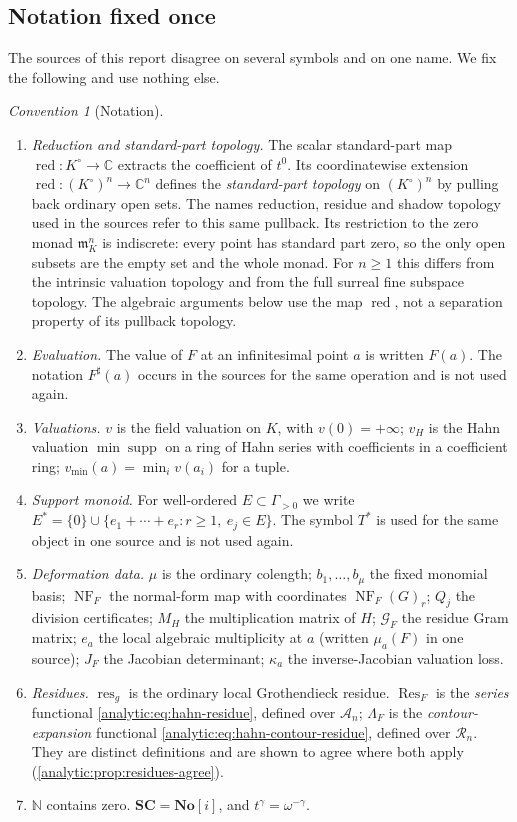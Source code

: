 \documentclass[11pt,letterpaper]{article}
\theoremstyle{definition}
\theoremstyle{remark}
\newtheorem{convention}[theorem]{Convention}
\newcommand{\C}{\mathbb C}
\newcommand{\N}{\mathbb N}
\newcommand{\No}{\mathbf{No}}
\newcommand{\SC}{\mathbf{SC}}
\newcommand{\A}{\mathscr A}
\newcommand{\RR}{\mathscr R}
\newcommand{\m}{\mathfrak m}
\newcommand{\Res}{\operatorname{Res}}
\newcommand{\res}{\operatorname{res}}
\newcommand{\supp}{\operatorname{supp}}
\newcommand{\NF}{\operatorname{NF}}
\newcommand{\red}{\operatorname{red}}
\newcommand{\vH}{v_{\!H}}
\newcommand{\vmin}{v_{\min}}
\numberwithin{equation}{section}
\begin{document}
\subsection{Notation fixed once}\label{analytic:subsec:conventions}
The sources of this report disagree on several symbols and on one name. We
fix the following and use nothing else.

\begin{convention}[Notation]\label{analytic:conv:notation}
\begin{enumerate}
\item \emph{Reduction and standard-part topology.} The scalar standard-part
map $\red:K^\circ\to\C$ extracts the coefficient of $t^0$. Its coordinatewise
extension $\red:(K^\circ)^n\to\C^n$ defines the \emph{standard-part topology}
on $(K^\circ)^n$ by pulling back ordinary open sets. The names reduction,
residue and shadow topology used in the sources refer to this same pullback.
Its restriction to the zero monad $\m_K^n$ is indiscrete: every point has
standard part zero, so the only open subsets are the empty set and the whole
monad. For $n\ge1$ this differs from the intrinsic valuation topology and
from the full surreal fine subspace topology. The algebraic arguments below use the
map $\red$, not a separation property of its pullback topology.
\item \emph{Evaluation.} The value of $F$ at an infinitesimal point $a$ is
written $F(a)$. The notation $F^\sharp(a)$ occurs in the sources for the
same operation and is not used again.
\item \emph{Valuations.} $v$ is the field valuation on $K$, with
$v(0)=+\infty$; $\vH$ is the Hahn valuation $\min\supp$ on a ring of Hahn
series with coefficients in a coefficient ring; $\vmin(a)=\min_iv(a_i)$ for
a tuple.
\item \emph{Support monoid.} For well-ordered $E\subset\Gamma_{>0}$ we write
$E^*=\{0\}\cup\{e_1+\cdots+e_r:r\ge1,\ e_j\in E\}$. The symbol $T^*$ is used
for the same object in one source and is not used again.
\item \emph{Deformation data.} $\mu$ is the ordinary colength;
$b_1,\ldots,b_\mu$ the fixed monomial basis; $\NF_F$ the normal-form map
with coordinates $\NF_F(G)_r$; $Q_j$ the division certificates; $M_H$ the
multiplication matrix of $H$; $\mathcal G_F$ the residue Gram matrix; $e_a$
the local algebraic multiplicity at $a$ (written $\mu_a(F)$ in one source);
$J_F$ the Jacobian determinant; $\kappa_a$ the inverse-Jacobian valuation
loss.
\item \emph{Residues.} $\res_g$ is the ordinary local Grothendieck residue.
$\Res_F$ is the \emph{series} functional \eqref{analytic:eq:hahn-residue},
defined over $\A_n$; $\Lambda_F$ is the \emph{contour-expansion} functional
\eqref{analytic:eq:hahn-contour-residue}, defined over $\RR_n$. They are
distinct definitions and are shown to agree where both apply
(\cref{analytic:prop:residues-agree}).
\item $\N$ contains zero. $\SC=\No[i]$, and $t^\gamma=\omega^{-\gamma}$.
\end{enumerate}
\end{convention}
\end{document}
